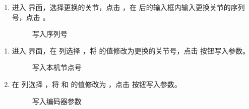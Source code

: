 \documentclass[a4paper,11pt,english,openany,oneside]{sphinxmanual}
\begin{document}
\begin{enumerate}
\begin{figure}[H]
\centering
\capstart

\noindent{}
\caption{连接机器人}\label{\detokenize{_u66f4_u6362_u5173_u8282:id155}}\end{figure}

\item {} 
\sphinxAtStartPar
进入  界面，选择更换的关节，点击 ，在  后的输入框内输入更换关节的序列号，点击 。

\begin{figure}[H]
\centering
\capstart

\noindent{}
\caption{写入序列号}\label{\detokenize{_u66f4_u6362_u5173_u8282:id156}}\end{figure}

\end{enumerate}

\sphinxAtStartPar
{}
\begin{enumerate}
%
\item {} 
\sphinxAtStartPar
进入  界面，在  列选择  ，将  的值修改为更换的关节号，点击  按钮写入参数。

\begin{figure}[H]
\centering
\capstart

\noindent{}
\caption{写入本机节点号}\label{\detokenize{_u66f4_u6362_u5173_u8282:id157}}\end{figure}

\item {} 
\sphinxAtStartPar
在  列选择  ，将  和  的值修改为  ，点击  按钮写入参数。

\begin{figure}[H]
\centering
\capstart

\noindent{}
\caption{写入编码器参数}\label{\detokenize{_u66f4_u6362_u5173_u8282:id158}}\end{figure}

\end{enumerate}
\end{document}
